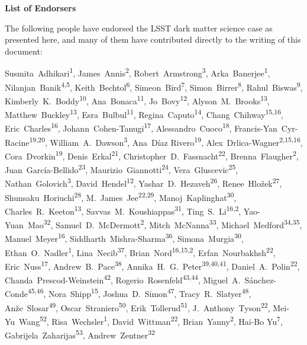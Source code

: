 
\begin{center}
  {\Large \bf List of Endorsers}
\end{center}
\bigskip

The following people have endorsed the LSST dark matter science case as presented here, and many of them have contributed directly to the writing of this document:

\def\altaffilmark#1{\textsuperscript{#1}}
\def\affil#1{\noindent #1 \\}

\normalsize
\begin{raggedright}

Susmita~Adhikari\altaffilmark{1},
James~Annis\altaffilmark{2},
Robert~Armstrong\altaffilmark{3},
Arka~Banerjee\altaffilmark{1},
Nilanjan~Banik\altaffilmark{4,5},
Keith~Bechtol\altaffilmark{6},
Simeon~Bird\altaffilmark{7},
Simon~Birrer\altaffilmark{8},
Rahul~Biswas\altaffilmark{9},
Kimberly~K.~Boddy\altaffilmark{10},
Ana~Bonaca\altaffilmark{11},
Jo~Bovy\altaffilmark{12},
Alyson~M.~Brooks\altaffilmark{13},
Matthew~Buckley\altaffilmark{13},
Esra~Bulbul\altaffilmark{11},
Regina~Caputo\altaffilmark{14},
Chang~Chihway\altaffilmark{15,16},
Eric~Charles\altaffilmark{16},
Johann~Cohen-Tanugi\altaffilmark{17},
Alessandro~Cuoco\altaffilmark{18},
Francis-Yan~Cyr-Racine\altaffilmark{19,20},
William~A.~Dawson\altaffilmark{3},
Ana~D\'{i}az Rivero\altaffilmark{19},
Alex~Drlica-Wagner\altaffilmark{2,15,16},
Cora~Dvorkin\altaffilmark{19},
Denis~Erkal\altaffilmark{21},
Christopher~D.~Fassnacht\altaffilmark{22},
Brenna~Flaugher\altaffilmark{2},
Juan~Garc\'ia-Bellido\altaffilmark{23},
Maurizio~Giannotti\altaffilmark{24},
Vera~Gluscevic\altaffilmark{25},
Nathan~Golovich\altaffilmark{3},
David~Hendel\altaffilmark{12},
Yashar~D.~Hezaveh\altaffilmark{26},
Renee~Hlo\v{z}ek\altaffilmark{27},
Shunsaku~Horiuchi\altaffilmark{28},
M.~James~Jee\altaffilmark{22,29},
Manoj~Kaplinghat\altaffilmark{30},
Charles~R.~Keeton\altaffilmark{13},
Savvas~M.~Koushiappas\altaffilmark{31},
Ting~S.~Li\altaffilmark{16,2},
Yao-Yuan~Mao\altaffilmark{32},
Samuel~D.~McDermott\altaffilmark{2},
Mitch~McNanna\altaffilmark{33},
Michael~Medford\altaffilmark{34,35},
Manuel~Meyer\altaffilmark{16},
Siddharth~Mishra-Sharma\altaffilmark{36},
Simona~Murgia\altaffilmark{30},
Ethan~O.~Nadler\altaffilmark{1},
Lina~Necib\altaffilmark{37},
Brian~Nord\altaffilmark{16,15,2},
Erfan~Nourbakhsh\altaffilmark{22},
Eric~Nuss\altaffilmark{17},
Andrew~B.~Pace\altaffilmark{38},
Annika~H.~G.~Peter\altaffilmark{39,40,41},
Daniel~A.~Polin\altaffilmark{22},
Chanda~Prescod-Weinstein\altaffilmark{42},
Rogerio~Rosenfeld\altaffilmark{43,44},
Miguel~A.~S\'anchez-Conde\altaffilmark{45,46},
Nora~Shipp\altaffilmark{15},
Joshua~D.~Simon\altaffilmark{47},
Tracy~R.~Slatyer\altaffilmark{48},
An\v{z}e~Slosar\altaffilmark{49},
Oscar~Straniero\altaffilmark{50},
Erik~Tollerud\altaffilmark{51},
J.~Anthony~Tyson\altaffilmark{22},
Mei-Yu~Wang\altaffilmark{52},
Risa~Wechsler\altaffilmark{1},
David~Wittman\altaffilmark{22},
Brian~Yanny\altaffilmark{2},
Hai-Bo Yu\altaffilmark{7},
Gabrijela~Zaharijas\altaffilmark{53},
Andrew~Zentner\altaffilmark{32}


\end{raggedright}
